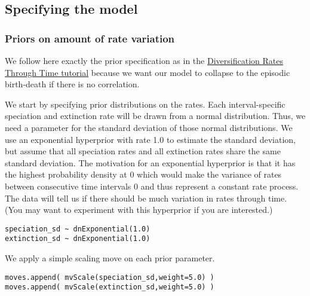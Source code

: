 \subsection{Specifying the model}

\subsubsection{Priors on amount of rate variation}
We follow here exactly the prior specification as in the \href{https://github.com/revbayes/revbayes_tutorial/raw/master/tutorial_TeX/RB_DiversificationRate_Episodic_Tutorial/RB_DiversificationRate_Episodic_Tutorial.pdf}{Diversification Rates Through Time tutorial} because we want our model to collapse to the episodic birth-death if there is no correlation.

We start by specifying prior distributions on the rates.
Each interval-specific speciation and extinction rate will be drawn from a normal distribution.
Thus, we need a parameter for the standard deviation of those normal distributions.
We use an exponential hyperprior with rate 1.0 to estimate the standard deviation, but assume that all speciation rates and all extinction rates share the same standard deviation.
The motivation for an exponential hyperprior is that it has the highest probability density at 0 which would make the variance of rates between consecutive time intervals 0 and thus represent a constant rate process.
The data will tell us if there should be much variation in rates through time.
(You may want to experiment with this hyperprior if you are interested.)
{\tt \begin{snugshade*}
\begin{lstlisting}
speciation_sd ~ dnExponential(1.0)
extinction_sd ~ dnExponential(1.0)
\end{lstlisting}
\end{snugshade*}}
We apply a simple scaling move on each prior parameter.
{\tt \begin{snugshade*}
\begin{lstlisting}
moves.append( mvScale(speciation_sd,weight=5.0) )
moves.append( mvScale(extinction_sd,weight=5.0) )
\end{lstlisting}
\end{snugshade*}}


